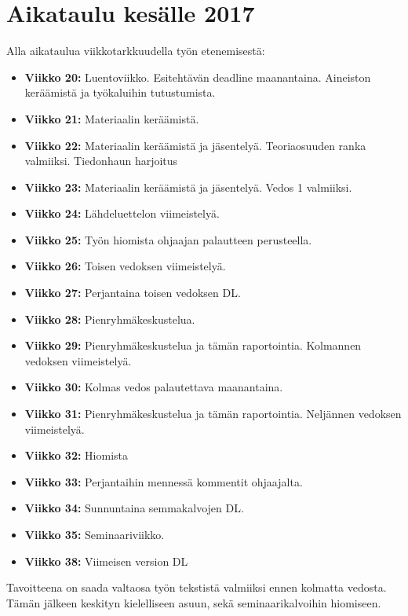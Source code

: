 \documentclass[finnish,12pt,a4paper,pdftex,elec,utf8]{aaltothesis}
\begin{document}
\section{Aikataulu kesälle 2017}
Alla aikataulua viikkotarkkuudella työn etenemisestä:
\begin{itemize}
    \item \textbf{Viikko 20:} Luentoviikko. Esitehtävän deadline maanantaina. Aineiston keräämistä ja työkaluihin tutustumista.
    \item \textbf{Viikko 21:} Materiaalin keräämistä.
    \item \textbf{Viikko 22:} Materiaalin keräämistä ja jäsentelyä. Teoriaosuuden ranka valmiiksi. Tiedonhaun harjoitus
    \item \textbf{Viikko 23:} Materiaalin keräämistä ja jäsentelyä. Vedos 1 valmiiksi.
    \item \textbf{Viikko 24:} Lähdeluettelon viimeistelyä.
    \item \textbf{Viikko 25:} Työn hiomista ohjaajan palautteen perusteella.
    \item \textbf{Viikko 26:} Toisen vedoksen viimeistelyä.
    \item \textbf{Viikko 27:} Perjantaina toisen vedoksen DL.
    \item \textbf{Viikko 28:} Pienryhmäkeskustelua.
    \item \textbf{Viikko 29:} Pienryhmäkeskustelua ja tämän raportointia. Kolmannen vedoksen viimeistelyä.
    \item \textbf{Viikko 30:} Kolmas vedos palautettava maanantaina.
    \item \textbf{Viikko 31:} Pienryhmäkeskustelua ja tämän raportointia. Neljännen vedoksen viimeistelyä.
    \item \textbf{Viikko 32:} Hiomista
    \item \textbf{Viikko 33:} Perjantaihin mennessä kommentit ohjaajalta.
    \item \textbf{Viikko 34:} Sunnuntaina semmakalvojen DL.
    \item \textbf{Viikko 35:} Seminaariviikko.
    \item \textbf{Viikko 38:} Viimeisen version DL
\end{itemize}
Tavoitteena on saada valtaosa työn tekstistä valmiiksi ennen kolmatta vedosta.
Tämän jälkeen keskityn kielelliseen asuun, sekä seminaarikalvoihin hiomiseen.
\clearpage

\nocite{*}


\end{document}
